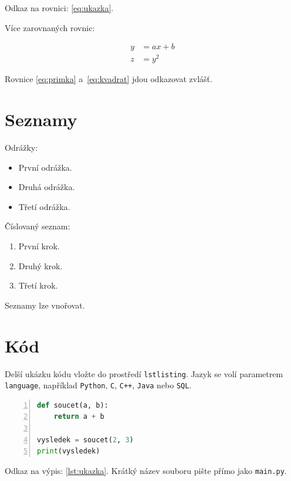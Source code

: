 Odkaz na rovnici: \eqref{eq:ukazka}.

Více zarovnaných rovnic:

\begin{align}
  y &= a x + b \label{eq:primka}\\
  z &= y^2     \label{eq:kvadrat}
\end{align}

Rovnice \eqref{eq:primka} a~\eqref{eq:kvadrat} jdou odkazovat zvlášť.

\section{Seznamy}

Odrážky:

\begin{itemize}
  \item První odrážka.
  \item Druhá odrážka.
  \item Třetí odrážka.
\end{itemize}

Číslovaný seznam:

\begin{enumerate}
  \item První krok.
  \item Druhý krok.
  \item Třetí krok.
\end{enumerate}

Seznamy lze vnořovat.

\section{Kód}

Delší ukázku kódu vložte do prostředí \texttt{lstlisting}. Jazyk se
volí parametrem \texttt{language}, například \texttt{Python},
\texttt{C}, \texttt{C++}, \texttt{Java} nebo \texttt{SQL}.

\begin{lstlisting}[language=Python,
                   numbers=left,
                   caption={Ukázkový výpis kódu.},
                   label={lst:ukazka}]
def soucet(a, b):
    return a + b

vysledek = soucet(2, 3)
print(vysledek)
\end{lstlisting}

Odkaz na výpis: \ref{lst:ukazka}. Krátký název souboru pište přímo
jako \texttt{main.py}.

